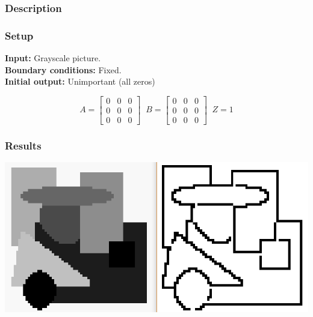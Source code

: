 \begin{multicols}{2}
\subsubsection{Description}
\lipsum[1]
\subsubsection{Setup}

\textbf{Input:} Grayscale picture.\\
\textbf{Boundary conditions:} Fixed.\\
\textbf{Initial output:} Unimportant (all zeros)

\begin{Figure}
 \centering
\begin{equation}
A =
\begin{bmatrix}
 0 & 0 & 0 \\
 0 & 0 & 0 \\
 0 & 0 & 0
\end{bmatrix}\;\;
B =
\begin{bmatrix}
 0 & 0 & 0 \\
 0 & 0 & 0 \\
 0 & 0 & 0
\end{bmatrix}\;\;
Z = 1
\end{equation}
\end{Figure}
\subsubsection{Results}

\begin{Figure}
 \centering
\includegraphics[width=\linewidth]{./Experiments/Template/fig/fig1.png}
\end{Figure}



\end{multicols}
